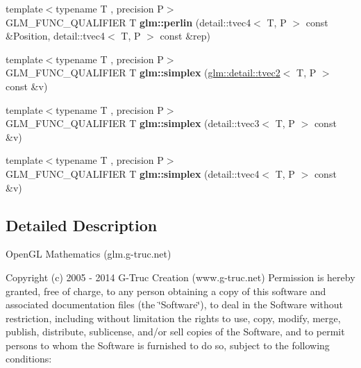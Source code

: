 \begin{DoxyCompactItemize}
\item 
{\footnotesize template$<$typename T , precision P$>$ }\\G\+L\+M\+\_\+\+F\+U\+N\+C\+\_\+\+Q\+U\+A\+L\+I\+F\+I\+ER T {\bfseries glm\+::perlin} (detail\+::tvec4$<$ T, P $>$ const \&Position, detail\+::tvec4$<$ T, P $>$ const \&rep)\hypertarget{namespaceglm_aae37c0aec171d76dc3ca061fe4ee8a9c}{}\label{namespaceglm_aae37c0aec171d76dc3ca061fe4ee8a9c}

\item 
{\footnotesize template$<$typename T , precision P$>$ }\\G\+L\+M\+\_\+\+F\+U\+N\+C\+\_\+\+Q\+U\+A\+L\+I\+F\+I\+ER T {\bfseries glm\+::simplex} (\hyperlink{structglm_1_1detail_1_1tvec2}{glm\+::detail\+::tvec2}$<$ T, P $>$ const \&v)\hypertarget{namespaceglm_abdfacc8dd98029ebf09c0a4a1ed505f5}{}\label{namespaceglm_abdfacc8dd98029ebf09c0a4a1ed505f5}

\item 
{\footnotesize template$<$typename T , precision P$>$ }\\G\+L\+M\+\_\+\+F\+U\+N\+C\+\_\+\+Q\+U\+A\+L\+I\+F\+I\+ER T {\bfseries glm\+::simplex} (detail\+::tvec3$<$ T, P $>$ const \&v)\hypertarget{namespaceglm_aa95d7bc123a0a077dc7f015333e2d674}{}\label{namespaceglm_aa95d7bc123a0a077dc7f015333e2d674}

\item 
{\footnotesize template$<$typename T , precision P$>$ }\\G\+L\+M\+\_\+\+F\+U\+N\+C\+\_\+\+Q\+U\+A\+L\+I\+F\+I\+ER T {\bfseries glm\+::simplex} (detail\+::tvec4$<$ T, P $>$ const \&v)\hypertarget{namespaceglm_aadad60578e53c3af96e0a078cc4ad462}{}\label{namespaceglm_aadad60578e53c3af96e0a078cc4ad462}

\end{DoxyCompactItemize}


\subsection{Detailed Description}
Open\+GL Mathematics (glm.\+g-\/truc.\+net)

Copyright (c) 2005 -\/ 2014 G-\/\+Truc Creation (www.\+g-\/truc.\+net) Permission is hereby granted, free of charge, to any person obtaining a copy of this software and associated documentation files (the \char`\"{}\+Software\char`\"{}), to deal in the Software without restriction, including without limitation the rights to use, copy, modify, merge, publish, distribute, sublicense, and/or sell copies of the Software, and to permit persons to whom the Software is furnished to do so, subject to the following conditions\+:

